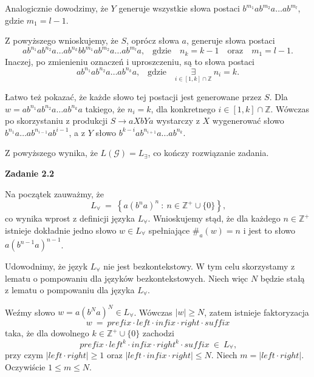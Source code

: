\documentclass[12pt]{article}
\begin{document}
	\medskip
	
	Analogicznie dowodzimy, że \(Y\) generuje wszystkie słowa postaci
	\(b^{m_{1}} a b^{m_{2}} a \ldots a b^{m_{l}}\), gdzie \(m_{1} = l - 1\).
	
	\medskip
	
	Z powyższego wnioskujemy, że \(S\), oprócz słowa \(a\), generuje słowa
	postaci
	\[ a b^{n_{1}} a b^{n_{2}} a \ldots a b^{n_{k}} b b^{m_{1}} a b^{m_{2}} a
	\ldots a b^{m_{l}} a \text{,} \quad \text{gdzie} \quad n_{k} = k - 1 \quad
	\text{oraz} \quad m_{1} = l - 1 \text{.} \]
	Inaczej, po zmienieniu oznaczeń i uproszczeniu, są to słowa postaci
	\[ a b^{n_{1}} a b^{n_{2}}a \ldots a b^{n_{k}} a \text{,} \quad \text{gdzie}
	\quad \underset{i \in \left[ 1, k \right] \cap \mathbb{Z}}{\exists} \ n_{i}
	= k \text{.} \]
	
	\medskip
	
	Łatwo też pokazać, że każde słowo tej postacji jest generowane przez \(S\).
	Dla \(w = a b^{n_{1}} a b^{n_{2}} a \ldots a b^{n_{k}} a\) takiego, że
	\(n_{i} = k\), dla konkretnego \(i \in \left[ 1, k \right] \cap
	\mathbb{Z}\). Wówczas po skorzystaniu z produkcji \(S \longrightarrow
	aXbYa\) wystarczy z \(X\) wygenerować słowo \(b^{n_{1}} a \ldots a
	b^{n_{i - 1}} a b^{i - 1}\), a z \(Y\) słowo \(b^{k - i} a b^{n_{i + 1}} a
	\ldots a b^{n_{k}}\).
	
	\medskip
	
	Z powyższego wynika, że \(L \left( \mathcal{G} \right) = L_{\exists}\), co
	kończy rozwiązanie zadania.
	
	\newpage
	
	\textbf{Zadanie 2.2}
	
	\medskip
	
	Na początek zauważmy, że
	\[ L_{\forall} \ = \ \left\{ a \left( b^{n} a \right) ^ {n} \ : \ n \in
	\mathbb{Z}^{+} \cup \{0\} \right\} \text{,} \]
	co wynika wprost z definicji języka \(L_{\forall}\). Wnioskujemy stąd, że
	dla każdego \(n \in \mathbb{Z}^{+}\) istnieje dokładnie jedno słowo \(w \in
	L_{\forall}\) spełniające \(\#_{a} \left( w \right) = n\) i jest to słowo
	\(a \left( b^{n - 1} a \right) ^ {n - 1}\).
	
	\medskip
	
	Udowodnimy, że język \(L_{\forall}\) nie jest bezkontekstowy. W tym celu
	skorzystamy z lematu o pompowaniu dla języków bezkontekstowych. Niech
	więc \(N\) będzie stałą z lematu o pompowaniu dla języka \(L_{\forall}\).
	
	\medskip
	
	Weźmy słowo \(w = a \left( b^{N} a \right) ^ {N} \in L_{\forall}\). Wówczas
	\(|w| \geqslant N\), zatem istnieje faktoryzacja
	\[ w \ = \ prefix \cdot left \cdot infix \cdot right \cdot suffix \]
	taka, że dla dowolnego \(k \in \mathbb{Z}^{+} \cup \{0\}\) zachodzi
	\[ prefix \cdot left^{k} \cdot infix \cdot right^{k} \cdot suffix \ \in \
	L_{\forall} \text{,} \]
	przy czym \(\left| left \cdot right \right| \geqslant 1\) oraz \(\left| left
	\cdot infix \cdot right \right| \leqslant N\). Niech \(m = \left| left \cdot
	right \right|\). Oczywiście \(1 \leqslant m \leqslant N\).
	
\end{document}

